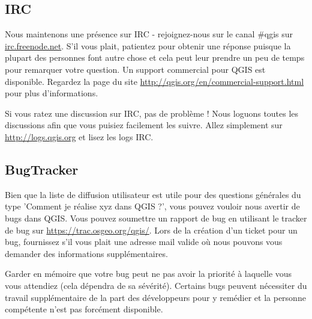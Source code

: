 \subsection{IRC}
Nous maintenons une présence sur IRC - rejoignez-nous sur le canal \#qgis sur
\url{irc.freenode.net}. S'il vous plait, patientez pour obtenir une réponse
puisque la plupart des personnes font autre chose et cela peut leur prendre un
peu de temps pour remarquer votre question. Un support commercial pour QGIS est
disponible. Regardez la page du site \url{http://qgis.org/en/commercial-support.html}
pour plus d'informations.

Si vous ratez une discussion sur IRC, pas de problème ! Nous loguons toutes les
discussions afin que vous puisiez facilement les suivre. Allez simplement sur
\url{http://logs.qgis.org} et lisez les logs IRC.

\subsection{BugTracker}
Bien que la liste de diffusion utilisateur est utile pour des questions
générales du type 'Comment je réalise xyz dans QGIS ?', vous pouvez vouloir
nous avertir de bugs dans QGIS. Vous pouvez soumettre un rapport de bug en
utilisant le tracker de bug sur \url{https://trac.osgeo.org/qgis/}. Lors de la
création d'un ticket pour un bug, fournissez s'il vous plait une adresse mail
valide où nous pouvons vous demander des informations supplémentaires.

Garder en mémoire que votre bug peut ne pas avoir la priorité à laquelle vous
vous attendiez (cela dépendra de sa sévérité). Certains bugs peuvent nécessiter du
travail supplémentaire de la part des développeurs pour y remédier et la personne
compétente n'est pas forcément disponible.

